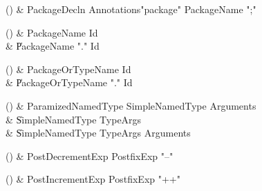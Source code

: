 \begin{bbgrammarappendix}

() & PackageDecln \label{prod:PackageDecln}  \: Annotations\opt \xcd"package" PackageName \xcd";"  \\


\end{bbgrammarappendix}

\begin{bbgrammarappendix}

() & PackageName \label{prod:PackageName}  \: Id  \\

 &    \| PackageName \xcd"." Id \\

\end{bbgrammarappendix}

\begin{bbgrammarappendix}

() & PackageOrTypeName \label{prod:PackageOrTypeName}  \: Id  \\

 &    \| PackageOrTypeName \xcd"." Id \\

\end{bbgrammarappendix}

\begin{bbgrammarappendix}

() & ParamizedNamedType \label{prod:ParamizedNamedType}  \: SimpleNamedType Arguments  \\

 &    \| SimpleNamedType TypeArgs \\
 &    \| SimpleNamedType TypeArgs Arguments \\

\end{bbgrammarappendix}

\begin{bbgrammarappendix}

() & PostDecrementExp \label{prod:PostDecrementExp}  \: PostfixExp \xcd"--"  \\


\end{bbgrammarappendix}

\begin{bbgrammarappendix}

() & PostIncrementExp \label{prod:PostIncrementExp}  \: PostfixExp \xcd"++"  \\


\end{bbgrammarappendix}

